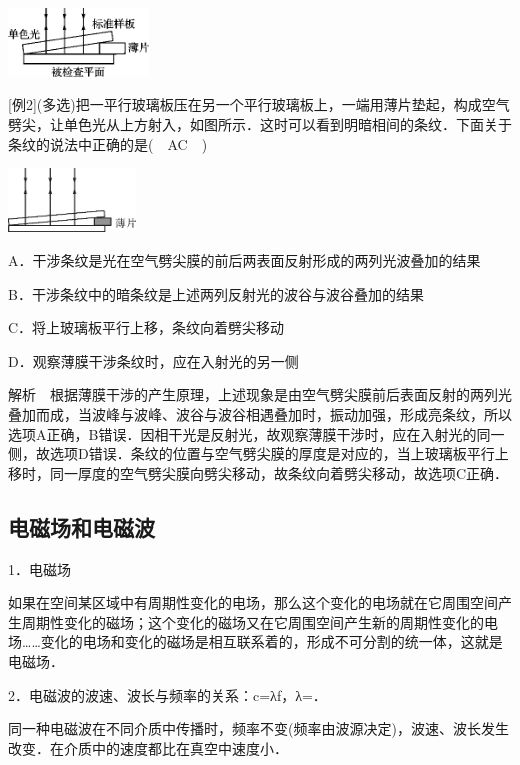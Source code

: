\begin{center}\includegraphics[width=1.47153in,height=0.71667in]{media/image561.png}\end{center}
{[}例2{]}(多选)把一平行玻璃板压在另一个平行玻璃板上，一端用薄片垫起，构成空气劈尖，让单色光从上方射入，如图所示．这时可以看到明暗相间的条纹．下面关于条纹的说法中正确的是(　AC　)

\begin{center}\includegraphics[width=1.32986in,height=0.67014in]{media/image562.png}\end{center}
A．干涉条纹是光在空气劈尖膜的前后两表面反射形成的两列光波叠加的结果

B．干涉条纹中的暗条纹是上述两列反射光的波谷与波谷叠加的结果

C．将上玻璃板平行上移，条纹向着劈尖移动

D．观察薄膜干涉条纹时，应在入射光的另一侧

解析　根据薄膜干涉的产生原理，上述现象是由空气劈尖膜前后表面反射的两列光叠加而成，当波峰与波峰、波谷与波谷相遇叠加时，振动加强，形成亮条纹，所以选项A正确，B错误．因相干光是反射光，故观察薄膜干涉时，应在入射光的同一侧，故选项D错误．条纹的位置与空气劈尖膜的厚度是对应的，当上玻璃板平行上移时，同一厚度的空气劈尖膜向劈尖移动，故条纹向着劈尖移动，故选项C正确．

\subsection{电磁场和电磁波}

1．电磁场

如果在空间某区域中有周期性变化的电场，那么这个变化的电场就在它周围空间产生周期性变化的磁场；这个变化的磁场又在它周围空间产生新的周期性变化的电场\ldots\ldots 变化的电场和变化的磁场是相互联系着的，形成不可分割的统一体，这就是电磁场．

2．电磁波的波速、波长与频率的关系：c=λf，λ=．

同一种电磁波在不同介质中传播时，频率不变(频率由波源决定)，波速、波长发生改变．在介质中的速度都比在真空中速度小．

